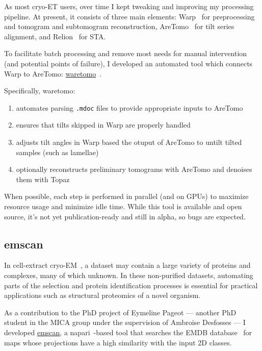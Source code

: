 As most cryo-ET users, over time I kept tweaking and improving my processing pipeline.
At present, it consists of three main elements: Warp~\cite{tegunovRealtimeCryoelectronMicroscopy2019} for preprocessing and tomogram and subtomogram reconstruction, AreTomo~\cite{zhengAreTomoIntegratedSoftware2022} for tilt series alignment, and Relion~\cite{scheresRELIONImplementationBayesian2012,zivanovBayesianApproachSingleparticle2022,burtImageProcessingPipeline2024} for STA.

To facilitate batch processing and remove most needs for manual intervention (and potential points of failure), I developed an automated tool which connects Warp to AreTomo: \href{https://gihub.com/brisvag/waretomo}{waretomo}~\cite{gaifasWaretomo2024}.

Specifically, waretomo:
\begin{enumerate}[noitemsep]
    \item automates parsing \texttt{.mdoc} files to provide appropriate inputs to AreTomo
    \item ensures that tilts skipped in Warp are properly handled
    \item adjusts tilt angles in Warp based the otuput of AreTomo to untilt tilted samples (such as lamellae)
    \item optionally reconstructs preliminary tomograms with AreTomo and denoises them with Topaz~\cite{beplerTopazDenoiseGeneralDeep2020}
\end{enumerate}

When possible, each step is performed in parallel (and on GPUs) to maximize resource usage and minimize idle time.
While this tool is available and open source, it's not yet publication-ready and still in alpha, so bugs are expected.

\subsection{emscan}

In cell-extract cryo-EM~\cite{suBuildRetrieveMethodology2021,kyrilisIntegrativeBiologyNative2019}, a dataset may contain a large variety of proteins and complexes, many of which unknown.
In these non-purified datasets, automating parts of the selection and protein identification processes is essential for practical applications such as structural proteomics of a novel organism.

As a contribution to the PhD project of Eymeline Pageot --- another PhD student in the MICA group under the supervision of Ambroise Desfosses --- I developed \href{https://gihub.com/brisvag/emscan}{emscan}, a napari~\cite{thenaparicommunityNapariMultidimensionalImage2024}-based tool that searches the EMDB database~\cite{thewwpdbconsortiumEMDBElectronMicroscopy2024} for maps whose projections have a high similarity with the input 2D classes.

